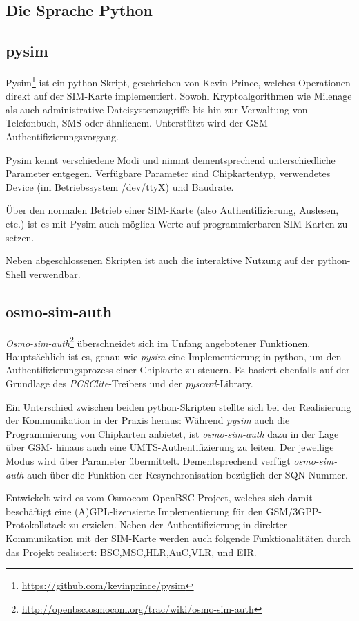 \subsection{Die Sprache Python}

\subsection{pysim}
Pysim\footnote{\url{https://github.com/kevinprince/pysim}} ist ein
python-Skript, geschrieben von Kevin Prince,
welches Operationen direkt auf der SIM-Karte implementiert.
Sowohl Kryptoalgorithmen wie Milenage als auch administrative Dateisystemzugriffe
bis hin zur Verwaltung von Telefonbuch, SMS oder ähnlichem.
Unterstützt wird der GSM-Authentifizierungsvorgang.

Pysim kennt verschiedene Modi und nimmt dementsprechend unterschiedliche
Parameter entgegen. Verfügbare Parameter sind Chipkartentyp, verwendetes
Device (im Betriebssystem /dev/ttyX) und Baudrate\cite{pysimprince}.

Über den normalen Betrieb einer SIM-Karte (also Authentifizierung, Auslesen, etc.)
ist es mit Pysim auch möglich Werte auf programmierbaren SIM-Karten zu setzen.

Neben abgeschlossenen Skripten ist auch die interaktive Nutzung auf der
python-Shell verwendbar.

\subsection{osmo-sim-auth}
\textit{Osmo-sim-auth}\footnote{\url{http://openbsc.osmocom.org/trac/wiki/osmo-sim-auth}}
überschneidet sich im Unfang angebotener Funktionen. Hauptsächlich ist es,
genau wie \textit{pysim} eine Implementierung in python, um den Authentifizierungsprozess
einer Chipkarte zu steuern. Es basiert ebenfalls auf der Grundlage des
\textit{PCSClite}-Treibers und der \textit{pyscard}-Library.

Ein Unterschied zwischen beiden python-Skripten stellte sich bei der
Realisierung der Kommunikation in der Praxis heraus:
Während \textit{pysim} auch die Programmierung von Chipkarten anbietet, ist
\textit{osmo-sim-auth} dazu in der Lage über \ac{GSM}- hinaus auch
eine \ac{UMTS}-Authentifizierung zu leiten.
Der jeweilige Modus wird über Parameter übermittelt.
Dementsprechend verfügt \textit{osmo-sim-auth} auch über die Funktion der
Resynchronisation bezüglich der \ac{SQN}-Nummer\cite{osmosimweb}.

Entwickelt wird es vom Osmocom OpenBSC-Project, welches sich damit
beschäftigt eine (A)GPL-lizensierte Implementierung für den
GSM/3GPP-Protokollstack zu erzielen. Neben der Authentifizierung
in direkter Kommunikation mit der SIM-Karte werden auch folgende
Funktionalitäten durch das Projekt realisiert:
\ac{BSC},\ac{MSC},\ac{HLR},\ac{AuC},\ac{VLR}, und \ac{EIR}\cite{osmocombscweb}.

